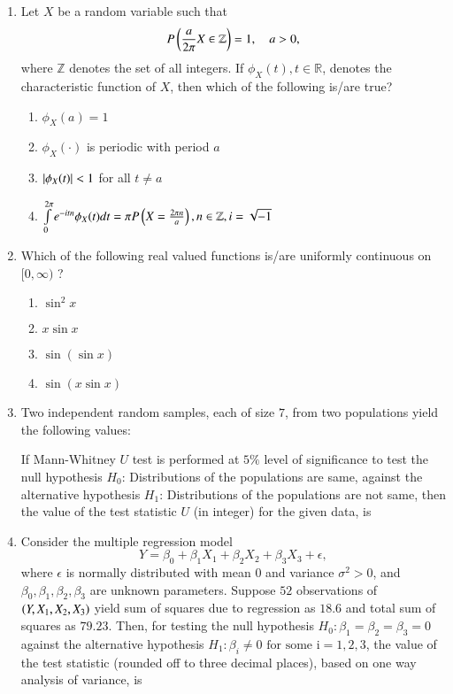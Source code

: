 \documentclass[journal]{IEEEtran}
\begin{document}
\begin{enumerate}
        \item Let $X$ be a random variable such that $$P\left(\frac{a}{2\pi}X \in \mathbb{Z}\right)=1,\quad a>0,$$ where $\mathbb{Z}$ denotes the set of all integers. If $\phi_{X}(t),t\in\mathbb{R}$, denotes the characteristic function of $X$, then which of the following is/are true?
            \begin{enumerate}
                \item $\phi_{X}(a) = 1$
                \item $\phi_{X}(\cdot)$ is periodic with period $a$
                \item $\left\vert\phi_{X}(t)\right\vert<1$ for all $t \neq a$
                \item $\int\limits_0^{2\pi}e^{-itn}\phi_{X}(t)dt = \pi P\left(X=\frac{2\pi n}{a}\right), n\in\mathbb{Z}, i=\sqrt{-1}$
            \end{enumerate}

        \item Which of the following real valued functions is/are uniformly continuous on $[0,\infty)$ ?
            \begin{enumerate}
                \item $\sin^2{x}$
                \item $x\sin{x}$
                \item $\sin{(\sin{x})}$
                \item $\sin{(x\sin{x})}$
            \end{enumerate}

    \item Two independent random samples, each of size $7$, from two populations yield the following values:
        \begin{table}[!ht]
            \centering
            
        \end{table}
        If Mann-Whitney $U$ test is performed at $5\%$ level of significance to test the null hypothesis $H_0$: Distributions of the populations are same, against the alternative hypothesis $H_1$: Distributions of the populations are not same, then the value of the test statistic $U$ (in integer) for the given data, is \underline{\hspace{1cm}}

    \item Consider the multiple regression model $$Y=\beta_0+\beta_1X_1+\beta_2X_2+\beta_3X_3+\epsilon,$$ where $\epsilon$ is normally distributed with mean $0$ and variance $\sigma^2 > 0$, and $\beta_0 , \beta_1, \beta_2, \beta_3$ are unknown parameters. Suppose $52$ observations of $\left(Y, X_1, X_2, X_3\right)$ yield sum of squares due to regression as $18.6$ and total sum of squares as $79.23$. Then, for testing the null hypothesis $H_0 : \beta_1 = \beta_2 = \beta_3 = 0$ against the alternative hypothesis $H_1: \beta_{i} \neq 0 \text{ for some i} = 1, 2, 3$, the value of the test statistic (rounded off to three decimal places), based on one way analysis of variance, is \underline{\hspace{1cm}}


\end{enumerate}
\end{document}
